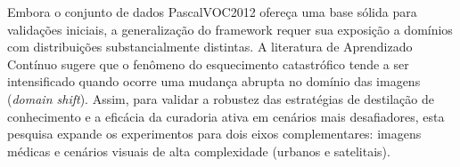 



Embora o conjunto de dados \ac{PascalVOC2012} ofereça uma base sólida para validações iniciais, a generalização do framework requer sua exposição a domínios com distribuições substancialmente distintas. A literatura de Aprendizado Contínuo sugere que o fenômeno do esquecimento catastrófico tende a ser intensificado quando ocorre uma mudança abrupta no domínio das imagens (\textit{domain shift}).
Assim, para validar a robustez das estratégias de destilação de conhecimento e a eficácia da curadoria ativa em cenários mais desafiadores, esta pesquisa expande os experimentos para dois eixos complementares: imagens médicas e cenários visuais de alta complexidade (urbanos e satelitais).


